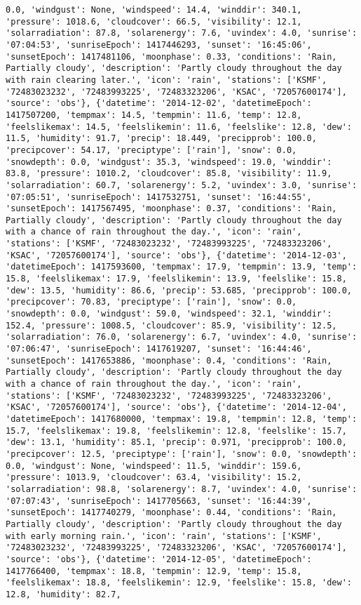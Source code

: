 \documentclass[
  letterpaper,
  DIV=11,
  numbers=noendperiod]{scrartcl}
\begin{document}
\begin{verbatim}
0.0, 'windgust': None, 'windspeed': 14.4, 'winddir': 340.1, 'pressure': 1018.6, 'cloudcover': 66.5, 'visibility': 12.1, 'solarradiation': 87.8, 'solarenergy': 7.6, 'uvindex': 4.0, 'sunrise': '07:04:53', 'sunriseEpoch': 1417446293, 'sunset': '16:45:06', 'sunsetEpoch': 1417481106, 'moonphase': 0.33, 'conditions': 'Rain, Partially cloudy', 'description': 'Partly cloudy throughout the day with rain clearing later.', 'icon': 'rain', 'stations': ['KSMF', '72483023232', '72483993225', '72483323206', 'KSAC', '72057600174'], 'source': 'obs'}, {'datetime': '2014-12-02', 'datetimeEpoch': 1417507200, 'tempmax': 14.5, 'tempmin': 11.6, 'temp': 12.8, 'feelslikemax': 14.5, 'feelslikemin': 11.6, 'feelslike': 12.8, 'dew': 11.5, 'humidity': 91.7, 'precip': 18.449, 'precipprob': 100.0, 'precipcover': 54.17, 'preciptype': ['rain'], 'snow': 0.0, 'snowdepth': 0.0, 'windgust': 35.3, 'windspeed': 19.0, 'winddir': 83.8, 'pressure': 1010.2, 'cloudcover': 85.8, 'visibility': 11.9, 'solarradiation': 60.7, 'solarenergy': 5.2, 'uvindex': 3.0, 'sunrise': '07:05:51', 'sunriseEpoch': 1417532751, 'sunset': '16:44:55', 'sunsetEpoch': 1417567495, 'moonphase': 0.37, 'conditions': 'Rain, Partially cloudy', 'description': 'Partly cloudy throughout the day with a chance of rain throughout the day.', 'icon': 'rain', 'stations': ['KSMF', '72483023232', '72483993225', '72483323206', 'KSAC', '72057600174'], 'source': 'obs'}, {'datetime': '2014-12-03', 'datetimeEpoch': 1417593600, 'tempmax': 17.9, 'tempmin': 13.9, 'temp': 15.8, 'feelslikemax': 17.9, 'feelslikemin': 13.9, 'feelslike': 15.8, 'dew': 13.5, 'humidity': 86.6, 'precip': 53.685, 'precipprob': 100.0, 'precipcover': 70.83, 'preciptype': ['rain'], 'snow': 0.0, 'snowdepth': 0.0, 'windgust': 59.0, 'windspeed': 32.1, 'winddir': 152.4, 'pressure': 1008.5, 'cloudcover': 85.9, 'visibility': 12.5, 'solarradiation': 76.0, 'solarenergy': 6.7, 'uvindex': 4.0, 'sunrise': '07:06:47', 'sunriseEpoch': 1417619207, 'sunset': '16:44:46', 'sunsetEpoch': 1417653886, 'moonphase': 0.4, 'conditions': 'Rain, Partially cloudy', 'description': 'Partly cloudy throughout the day with a chance of rain throughout the day.', 'icon': 'rain', 'stations': ['KSMF', '72483023232', '72483993225', '72483323206', 'KSAC', '72057600174'], 'source': 'obs'}, {'datetime': '2014-12-04', 'datetimeEpoch': 1417680000, 'tempmax': 19.8, 'tempmin': 12.8, 'temp': 15.7, 'feelslikemax': 19.8, 'feelslikemin': 12.8, 'feelslike': 15.7, 'dew': 13.1, 'humidity': 85.1, 'precip': 0.971, 'precipprob': 100.0, 'precipcover': 12.5, 'preciptype': ['rain'], 'snow': 0.0, 'snowdepth': 0.0, 'windgust': None, 'windspeed': 11.5, 'winddir': 159.6, 'pressure': 1013.9, 'cloudcover': 63.4, 'visibility': 15.2, 'solarradiation': 98.8, 'solarenergy': 8.7, 'uvindex': 4.0, 'sunrise': '07:07:43', 'sunriseEpoch': 1417705663, 'sunset': '16:44:39', 'sunsetEpoch': 1417740279, 'moonphase': 0.44, 'conditions': 'Rain, Partially cloudy', 'description': 'Partly cloudy throughout the day with early morning rain.', 'icon': 'rain', 'stations': ['KSMF', '72483023232', '72483993225', '72483323206', 'KSAC', '72057600174'], 'source': 'obs'}, {'datetime': '2014-12-05', 'datetimeEpoch': 1417766400, 'tempmax': 18.8, 'tempmin': 12.9, 'temp': 15.8, 'feelslikemax': 18.8, 'feelslikemin': 12.9, 'feelslike': 15.8, 'dew': 12.8, 'humidity': 82.7, 
\end{verbatim}
\end{document}
